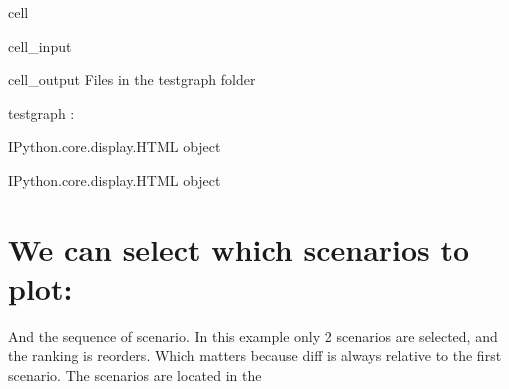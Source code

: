 \documentclass[letterpaper,10pt,english]{jupyterBook}
\begin{document}
\begin{sphinxuseclass}{cell}\begin{sphinxVerbatimInput}

\begin{sphinxuseclass}{cell_input}
\begin{sphinxVerbatim}[commandchars=\\\{\}]
  
\end{sphinxVerbatim}

\end{sphinxuseclass}\end{sphinxVerbatimInput}
\begin{sphinxVerbatimOutput}

\begin{sphinxuseclass}{cell_output}
\sphinxAtStartPar
Files in the testgraph folder

\begin{sphinxVerbatim}[commandchars=\\\{\}]
testgraph :
\end{sphinxVerbatim}

\begin{sphinxVerbatim}[commandchars=\\\{\}]
\PYGZlt{}IPython.core.display.HTML object\PYGZgt{}
\end{sphinxVerbatim}

\begin{sphinxVerbatim}[commandchars=\\\{\}]
\PYGZlt{}IPython.core.display.HTML object\PYGZgt{}
\end{sphinxVerbatim}

\end{sphinxuseclass}\end{sphinxVerbatimOutput}

\end{sphinxuseclass}

\section{We can select which scenarios to plot:}
\label{\detokenize{content/howto/keep/Create and modify charts with keep_plot:we-can-select-which-scenarios-to-plot}}
\sphinxAtStartPar
And the sequence of scenario. 
In this example only 2 scenarios are selected, and the ranking is reorders. Which matters because diff is always relative to the first scenario.
The scenarios are located in the
\end{document}
